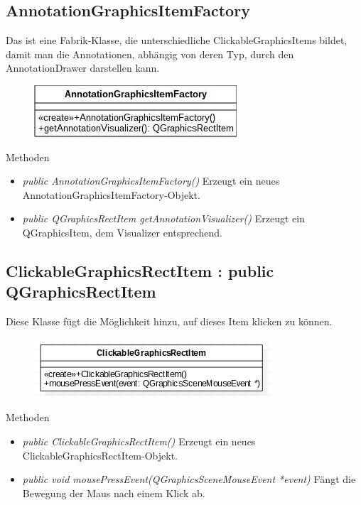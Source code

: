 \subsection*{AnnotationGraphicsItemFactory}
Das ist eine Fabrik-Klasse, die unterschiedliche ClickableGraphicsItems bildet, damit man die Annotationen, abhängig von deren Typ, durch den AnnotationDrawer darstellen kann.

\begin{figure}[H]
	\centering
	\includegraphics[scale=0.5]{img/Klassendiagramm/Klassen/View/AnnotationGraphicsItemFactory}
	\label{fig:annotationGraphicsItemFactory}
\end{figure}

Methoden
\begin{itemize}
	\item\textit{public AnnotationGraphicsItemFactory()} 
	Erzeugt ein neues AnnotationGraphicsItemFactory-Objekt.
	\item\textit{public QGraphicsRectItem getAnnotationVisualizer()} 
	Erzeugt ein QGraphicsItem, dem Visualizer entsprechend.
\end{itemize}
 
\subsection*{ClickableGraphicsRectItem : public QGraphicsRectItem}
Diese Klasse fügt die Möglichkeit hinzu, auf dieses Item klicken zu können.

\begin{figure}[H]
	\centering
	\includegraphics[scale=0.5]{img/Klassendiagramm/Klassen/View/ClickableGraphicsRectItem}
	\label{fig:clickableGraphicsRectItem}
\end{figure}

Methoden
\begin{itemize}
	\item\textit{public ClickableGraphicsRectItem()}
	Erzeugt ein neues ClickableGraphicsRectItem-Objekt.
	\item\textit{public void mousePressEvent(QGraphicsSceneMouseEvent *event)}
	Fängt die Bewegung der Maus nach einem Klick ab.
\end{itemize}

